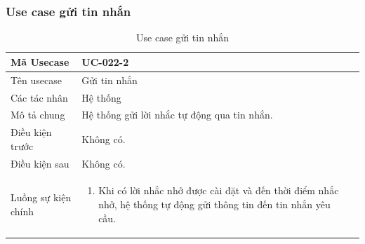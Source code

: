 \documentclass[12pt,a4paper]{article}
\begin{document}
    \subsubsection*{Use case gửi tin nhắn}
    \begin{table}[H]
        \centering
        \begin{tabular}{|p{3.5cm}|p{11.5cm}|c|}
            \hline
            Mã Usecase      & UC-022-2                                    \\
            \hline
            Tên usecase     & Gửi tin nhắn                                \\
            \hline
            Các tác nhân    & Hệ thống                                    \\
            \hline
            Mô tả chung     & Hệ thống gửi lời nhắc tự động qua tin nhắn. \\
            \hline

            Điều kiện trước & Không có.                                   \\
            \hline

            Điều kiện sau   & Không có.                                   \\
            \hline

            Luồng sự kiện chính & \vspace{-.8cm}\begin{enumerate}
                                                    \item Khi có lời nhắc nhở được cài đặt và đến thời điểm nhắc nhở, hệ thống tự động gửi thông tin đến tin nhắn yêu cầu.
            \end{enumerate}
            \\
            \hline
        \end{tabular}
        \caption{Use case gửi tin nhắn}

    \end{table}


\end{document}
